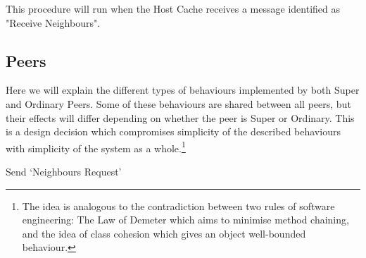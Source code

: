 This procedure will run when the Host Cache receives a message identified as
"Receive Neighbours".

\subsection{Peers}

Here we will explain the different types of behaviours implemented by both Super
and Ordinary Peers. Some of these behaviours are shared between all peers, but
their effects will differ depending on whether the peer is Super or Ordinary.
This is a design decision which compromises simplicity of the described
behaviours with simplicity of the system as a whole.\footnote{The idea is analogous to the contradiction between two rules of software
engineering: The Law of Demeter which aims to minimise method chaining, and the
idea of class cohesion which gives an object well-bounded behaviour.}

\begin{algorithm}[H]
\caption{Send `Neighbours Request'}
\end{algorithm}




